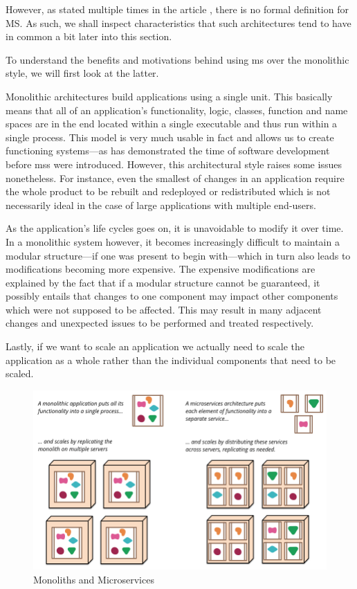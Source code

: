 However, as stated multiple times in the article \cite{ms-definition},
there is no formal definition for MS. As such, we shall inspect
characteristics that such architectures tend to have in common a bit
later into this section.

To understand the benefits and motivations behind using \gls{ms} over
the monolithic style, we will first look at the latter.
\cite{ms-definition}

Monolithic architectures build applications using a single unit. This
basically means that all of an application's functionality, logic,
classes, function and name spaces are in the end located within a
single executable and thus run within a single process.
\cite{ms-definition} This model is very much usable in fact and allows
us to create functioning systems---as has demonstrated the time of
software development before \glspl{ms} were introduced. However, this
architectural style raises some issues nonetheless. For instance, even
the smallest of changes in an application require the whole product to
be rebuilt and redeployed or redistributed which is not necessarily
ideal in the case of large applications with multiple end-users.

As the application's life cycles goes on, it is unavoidable to modify
it over time. In a monolithic system however, it becomes increasingly
difficult to maintain a modular structure---if one was present to
begin with---which in turn also leads to modifications becoming more
expensive. \cite{ms-definition} The expensive modifications are
explained by the fact that if a modular structure cannot be
guaranteed, it possibly entails that changes to one component may
impact other components which were not supposed to be affected.
\cite{ms-definition} This may result in many adjacent changes and
unexpected issues to be performed and treated respectively.

Lastly, if we want to scale an application we actually need to scale
the application as a whole rather than the individual components that
need to be scaled.

\begin{figure}
	\centering
	\includegraphics[width=0.75\linewidth]{images/sketch.png}
	\caption{Monoliths and Microservices \cite{ms-definition}}
	\label{fig:monoliths-ms}
\end{figure}


